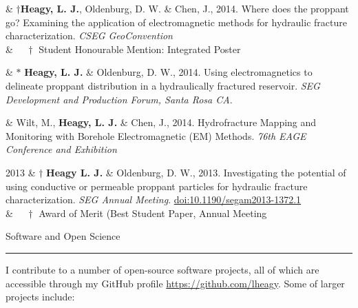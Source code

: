 \documentclass[a4paper, 11pt]{article}
\newcommand{\doi}[1]{\href{https://doi.org/#1}{doi:#1}}
\newcommand{\heading}[1]{
\begin{samepage}
    \vspace{0.5cm}
    {%
    \LARGE
    #1}\\
    \vspace{-0.2cm}
    \hrule
    \vspace{0.2cm}
\end{samepage}
}
\begin{document}
\begin{entryright}
& $\dagger$\textbf{Heagy, L. J.}, Oldenburg, D. W. \& Chen, J., 2014. Where does the proppant go? Examining the application of electromagnetic methods for hydraulic fracture characterization. \emph{CSEG GeoConvention} \\
& $\quad \dagger$ Student Honourable Mention: Integrated Poster
\end{entryright}

\begin{entryright}
& $*$ \textbf{Heagy, L. J.} \& Oldenburg, D. W., 2014. Using electromagnetics to delineate proppant distribution in a hydraulically fractured reservoir. \emph{SEG Development and Production Forum, Santa Rosa CA}.
\end{entryright}

\begin{entryright}
& Wilt, M., \textbf{Heagy, L. J.} \& Chen, J., 2014. Hydrofracture Mapping and Monitoring with Borehole Electromagnetic (EM) Methods. \emph{76th EAGE Conference and Exhibition}
\end{entryright}

\begin{entryright}
2013 & $\dagger$ \textbf{Heagy L. J.} \& Oldenburg, D. W., 2013. Investigating the potential of using conductive or permeable proppant particles for hydraulic fracture characterization. \emph{SEG Annual Meeting}. \doi{10.1190/segam2013-1372.1} \\
& $\quad\dagger$ Award of Merit (Best Student Paper, Annual Meeting
\end{entryright}




\heading{Software and Open Science}

I contribute to a number of open-source software projects, all of which are accessible through my GitHub profile \href{https://github.com/lheagy}{https://github.com/lheagy}. Some of larger projects include:
\\
\end{document}
